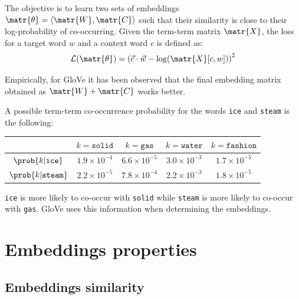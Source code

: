 \begin{description}
        The objective is to learn two sets of embeddings $\matr{\theta} = \langle\matr{W}, \matr{C}\rangle$ such that their similarity is close to their log-probability of co-occurring. Given the term-term matrix $\matr{X}$, the loss for a target word $w$ and a context word $c$ is defined as:
        \[ \mathcal{L}(\matr{\theta}) = \left( \vec{c} \cdot \vec{w} - \log( \matr{X}[c, w] ) \right)^2 \]

        \begin{remark}
            Empirically, for GloVe it has been observed that the final embedding matrix obtained as $\matr{W} + \matr{C}$ works better.
        \end{remark}

        \begin{example}
            A possible term-term co-occurrence probability for the words \texttt{ice} and \texttt{steam} is the following:
            \begin{table}[H]
                \centering
                \footnotesize
                \begin{tabular}{ccccc}
                    \toprule
                    & $k=\texttt{solid}$ & $k=\texttt{gas}$ & $k=\texttt{water}$ & $k=\texttt{fashion}$ \\
                    \midrule
                    $\prob{k | \texttt{ice}}$ & $1.9 \times 10^{-4}$ & $6.6 \times 10^{-5}$ & $3.0 \times 10^{-3}$ & $1.7 \times 10^{-5}$ \\
                    $\prob{k | \texttt{steam}}$ & $2.2 \times 10^{-5}$ & $7.8 \times 10^{-4}$ & $2.2 \times 10^{-3}$ & $1.8 \times 10^{-5}$ \\
                    \bottomrule
                \end{tabular}
            \end{table}
            \texttt{ice} is more likely to co-occur with \texttt{solid} while \texttt{steam} is more likely to co-occur with \texttt{gas}. GloVe uses this information when determining the embeddings.
        \end{example}
\end{description}



\section{Embeddings properties}


\subsection{Embeddings similarity}


